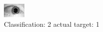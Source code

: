 \begin{figure}[h!]
\begin{center}
\includegraphics[width=0.60\columnwidth]{figures/ID1539_class_2_target_1.png}
\end{center}
\caption{ Classification: 2 actual target: 1}
\label{fig:ID1539_class_2_target_1}
\end{figure}
